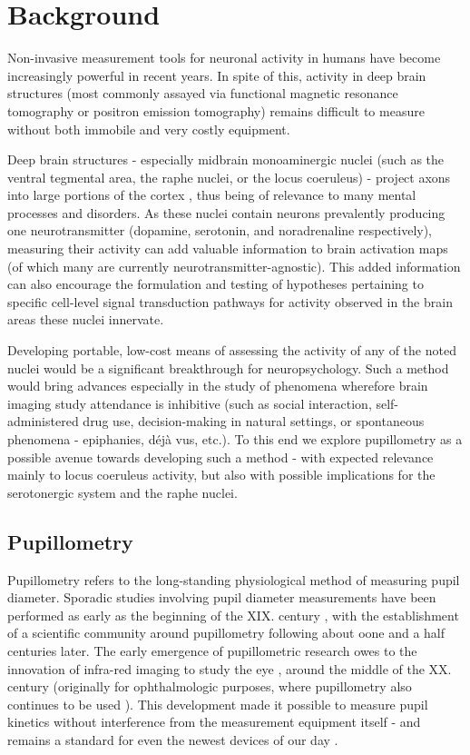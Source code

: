 \chapter{Background}
    Non-invasive measurement tools for neuronal activity in humans have become increasingly powerful in recent years.
    In spite of this, activity in deep brain structures (most commonly assayed via functional magnetic resonance tomography or positron emission tomography) remains difficult to measure without both immobile and very costly equipment.
    
    Deep brain structures - especially midbrain monoaminergic nuclei (such as the ventral tegmental area, the raphe nuclei, or the locus coeruleus) - project axons into large portions of the cortex \citep{vanDomburg1991,Hornung2003,Loughlin1982}, thus being of relevance to many mental processes and disorders.
    As these nuclei contain neurons prevalently producing one neurotransmitter (dopamine, serotonin, and noradrenaline respectively), measuring their activity can add valuable information to brain activation maps (of which many are currently neurotransmitter-agnostic).
    This added information can also encourage the formulation and testing of hypotheses pertaining to specific cell-level signal transduction pathways for activity observed in the brain areas these nuclei innervate.
    
    Developing portable, low-cost means of assessing the activity of any of the noted nuclei would be a significant breakthrough for neuropsychology.
    Such a method would bring advances especially in the study of phenomena wherefore brain imaging study attendance is inhibitive
    (such as social interaction, self-administered drug use, decision-making in natural settings, or spontaneous phenomena - epiphanies, déjà vus, etc.).
    To this end we explore pupillometry as a possible avenue towards developing such a method - with expected relevance mainly to locus coeruleus activity, but also with possible implications for the serotonergic system and the raphe nuclei.
    \section{Pupillometry}\label{sec:b_p}
	Pupillometry refers to the long-standing physiological method of measuring pupil diameter.
	Sporadic studies involving pupil diameter measurements have been performed as early as the beginning of the XIX. century \citep{Loewenfeld1958},
	with the establishment of a scientific community around pupillometry following about oone and a half centuries later.
	The early emergence of pupillometric research owes to the innovation of infra-red imaging to study the eye \citep{Dubois1955}, around the middle of the XX. century (originally for ophthalmologic purposes, where pupillometry also continues to be used \citep{Thompson2012}).
	This development made it possible to measure pupil kinetics without interference from the measurement equipment itself - and remains a standard for even the newest devices of our day \citep{Bradley2010}.
	
